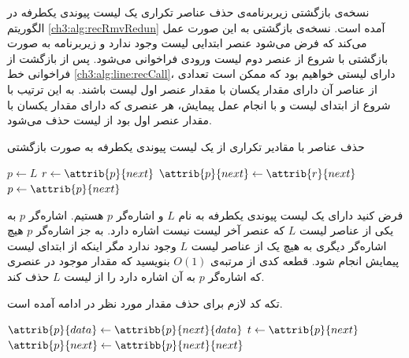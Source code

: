 نسخه‌ی بازگشتی زیربرنامه‌ی حذف عناصر تکراری یک لیست پیوندی یکطرفه در الگوریتم {\eqref{ch3:alg:recRmvRedun}} آمده است. نسخه‌ی بازگشتی به این صورت عمل می‌کند که فرض می‌شود عنصر ابتدایی لیست وجود ندارد و زیربرنامه به صورت بازگشتی با شروع از عنصر دوم لیست ورودی فراخوانی می‌شود. پس از بازگشت از فراخوانی خط {\ref{ch3:alg:line:recCall}}، دارای لیستی خواهیم بود که ممکن است تعدادی از عناصر آن دارای مقدار یکسان با مقدار عنصر اول لیست باشند. به این ترتیب با شروع از ابتدای لیست و با انجام عمل پیمایش، هر عنصری که دارای مقدار یکسان با مقدار عنصر اول بود از لیست حذف می‌شود.
\begin{algorithm}
\caption{حذف عناصر با مقادیر تکراری از یک لیست پیوندی یکطرفه به صورت بازگشتی}\label{ch3:alg:recRmvRedun}
\begin{latin}
\begin{algorithmic}[1]
				\State	\Return
		\EndIf
		\State	{}\label{ch3:alg:line:recCall}
		\State	$p \gets L$
						\State	$r \gets \attrib{p}{next}$
						\State	$\attrib{p}{next} \gets \attrib{r}{next}$
						\State	{}
				\Else
						\State	$p \gets \attrib{p}{next}$
				\EndIf
		\EndWhile			
\EndProcedure
\end{algorithmic}
\end{latin}
\end{algorithm}

 فرض کنید دارای یک لیست پیوندی یکطرفه به نام {$L$} و اشاره‌گر {$p$} هستیم. اشاره‌گر {$p$} به یکی از عناصر لیست {$L$} که عنصر آخر لیست نیست اشاره دارد. به جز اشاره‌گر {$p$} هیچ اشاره‌گر دیگری به هیچ یک از عناصر لیست {$L$} وجود ندارد مگر اینکه از ابتدای لیست پیمایش انجام شود. قطعه کدی از مرتبه‌ی {$O(1)$} بنویسید که مقدار موجود در عنصری که اشاره‌گر {$p$} به آن اشاره دارد را از لیست {$L$} حذف کند.


تکه کد لازم برای حذف مقدار مورد نظر در ادامه آمده است.
\begin{latin}
\begin{algorithmic}[1]
		\State	$\attrib{p}{data} \gets \attribb{p}{next}{data}$
		\State	$t \gets \attrib{p}{next}$
		\State	$\attrib{p}{next} \gets \attribb{p}{next}{next}$
		\State	{}
\end{algorithmic}
\end{latin}

